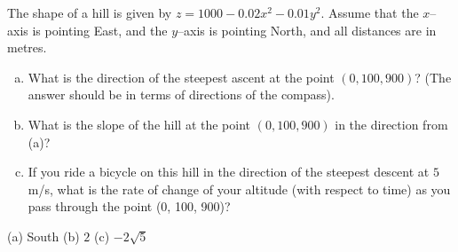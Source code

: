\begin{question}[M200 2013D] %
The shape of a hill is given by $z = 1000 - 0.02x^2 - 0.01y^2$. 
Assume that the $x$--axis is pointing East, and the $y$--axis 
is pointing North, and all distances are in metres.
\begin{enumerate}[(a)]
\item
What is the direction of the steepest ascent at the point $(0, 100, 900)$? 
(The answer should be in terms of directions of the compass).
\item
What is the slope of the hill at the point $(0, 100, 900)$ in the 
direction from (a)?
\item
If you ride a bicycle on this hill in the direction of the steepest 
descent at $5$ m/s, what is the rate of change of your altitude 
(with respect to time) as you pass through the point (0, 100, 900)?
\end{enumerate}
\end{question}

%

\begin{answer}
(a) South\qquad
(b) $2$\qquad
(c) $-2\sqrt{5}$
\end{answer}

